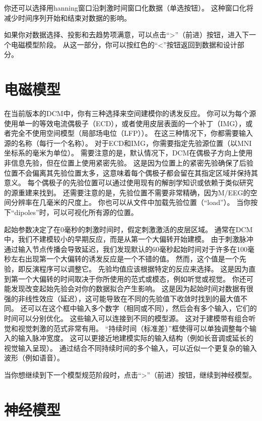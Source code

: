 你还可以选择用hanning窗口沿刺激时间窗口化数据（单选按钮）。
这种窗口化将减少时间序列开始和结束对数据的影响。

如果你对数据选择、投影和去趋势项满意，可以点击“>”（前进）按钮，进入下一个电磁模型阶段。
从这一部分，你可以按红色的“<”按钮返回到数据和设计部分。


\section{电磁模型}

在当前版本的DCM中，你有三种选择来空间建模你的诱发反应。
你可以为每个源使用单一的等效电流偶极子（ECD），或者使用皮层表面的一个补丁（IMG），或者完全不使用空间模型（局部场电位（LFP））。
在这三种情况下，你都需要输入源的名称（每行一个名称）。
对于ECD和IMG，你需要指定先验源位置（以MNI坐标系的毫米为单位）。
需要注意的是，默认情况下，DCM在偶极子方向上使用非信息先验，但在位置上使用紧密先验。
这是因为位置上的紧密先验确保了后验位置不会偏离其先验位置太多，这意味着每个偶极子都会留在其指定区域并保持其意义。
每个偶极子的先验位置可以通过使用现有的解剖学知识或依赖于类似研究的源重建来找到。
还需要注意的是，先验位置不需要非常精确，因为M/EEG的空间分辨率在几毫米的尺度上。
你也可以从文件中加载先验位置（“load”）。
当你按下“dipoles”时，可以可视化所有源的位置。

起始参数决定了在0毫秒的刺激时间时，假定刺激激活的皮层区域。
通常在DCM中，我们不建模较小的早期反应，而是从第一个大偏转开始建模。
由于刺激脉冲通过输入节点传播会导致延迟，我们发现默认的60毫秒起始时间对于许多在100毫秒左右出现第一个大偏转的诱发反应是一个不错的值。
然而，这个值是一个先验，即反演程序可以调整它。
先验均值应该根据特定的反应来选择。
这是因为直到第一个大偏转的时间取决于你所使用的范式或模态，例如听觉或视觉。
你还可能发现改变起始先验会对你的数据拟合产生影响。
这是因为起始时间对数据有很强的非线性效应（延迟），这可能导致在不同的先验值下收敛时找到的最大值不同。
还可以在这个框中输入多个数字（相同或不同），然后会有多个输入，它们的时间可以分别优化。
这些输入可以连接到不同的模型源。
这对于建模带有组合听觉和视觉刺激的范式非常有用。
“持续时间（标准差）”框使得可以单独调整每个输入的输入脉冲宽度。
这可以更接近地建模实际的输入结构（例如长音调或延长的视觉输入呈现）。
通过结合不同持续时间的多个输入，可以近似一个更复杂的输入波形（例如语音）。

当你想继续到下一个模型规范阶段时，点击“>”（前进）按钮，继续到神经模型。


\section{神经模型}

